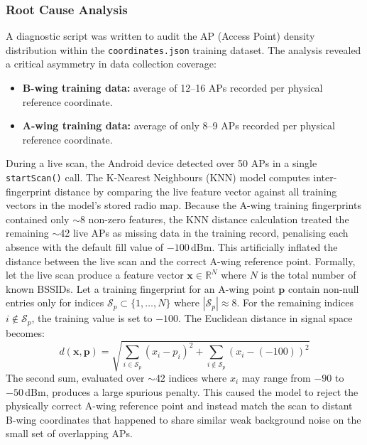 \documentclass[11pt,a4paper]{article}
\begin{document}
\subsubsection{Root Cause Analysis}
A diagnostic script was written to audit the AP (Access Point) density distribution within the \texttt{coordinates.json} training dataset. The analysis revealed a critical asymmetry in data collection coverage:
\begin{itemize}
\item \textbf{B-wing training data:} average of 12--16 APs recorded per physical reference coordinate.
\item \textbf{A-wing training data:} average of only 8--9 APs recorded per physical reference coordinate.
\end{itemize}
During a live scan, the Android device detected over 50 APs in a single \texttt{startScan()} call. The K-Nearest Neighbours (KNN) model computes inter-fingerprint distance by comparing the live feature vector against all training vectors in the model's stored radio map. Because the A-wing training fingerprints contained only $\sim$8 non-zero features, the KNN distance calculation treated the remaining $\sim$42 live APs as missing data in the training record, penalising each absence with the default fill value of $-100$\,dBm. This artificially inflated the distance between the live scan and the correct A-wing reference point.
Formally, let the live scan produce a feature vector $\mathbf{x} \in \mathbb{R}^N$ where $N$ is the total number of known BSSIDs. Let a training fingerprint for an A-wing point $\mathbf{p}$ contain non-null entries only for indices $\mathcal{S}_p \subset \{1, \ldots, N\}$ where $|\mathcal{S}_p| \approx 8$. For the remaining indices $i \notin \mathcal{S}_p$, the training value is set to $-100$. The Euclidean distance in signal space becomes:
\begin{equation}
d(\mathbf{x}, \mathbf{p}) = \sqrt{\sum_{i \in \mathcal{S}_p}(x_i - p_i)^2 + \sum_{i \notin \mathcal{S}_p}(x_i - (-100))^2}
\end{equation}
The second sum, evaluated over $\sim$42 indices where $x_i$ may range from $-90$ to $-50$\,dBm, produces a large spurious penalty. This caused the model to reject the physically correct A-wing reference point and instead match the scan to distant B-wing coordinates that happened to share similar weak background noise on the small set of overlapping APs.
\end{document}
